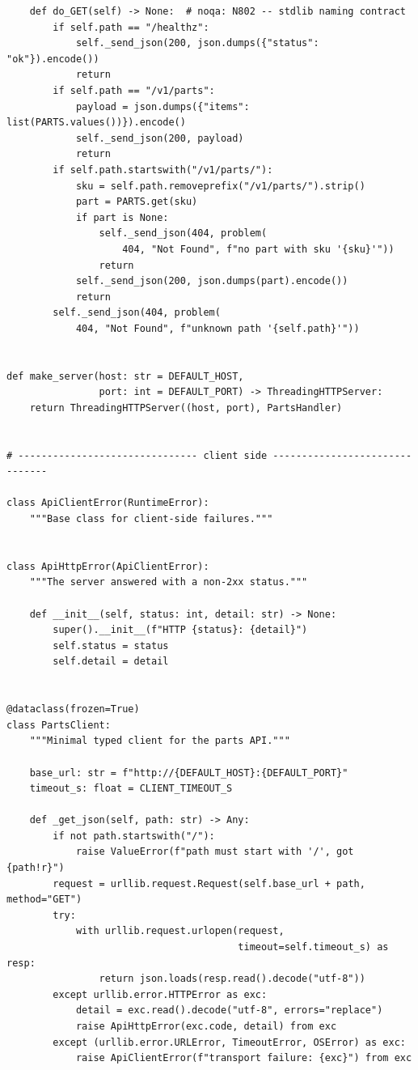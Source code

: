 \begin{verbatim}
    def do_GET(self) -> None:  # noqa: N802 -- stdlib naming contract
        if self.path == "/healthz":
            self._send_json(200, json.dumps({"status": "ok"}).encode())
            return
        if self.path == "/v1/parts":
            payload = json.dumps({"items": list(PARTS.values())}).encode()
            self._send_json(200, payload)
            return
        if self.path.startswith("/v1/parts/"):
            sku = self.path.removeprefix("/v1/parts/").strip()
            part = PARTS.get(sku)
            if part is None:
                self._send_json(404, problem(
                    404, "Not Found", f"no part with sku '{sku}'"))
                return
            self._send_json(200, json.dumps(part).encode())
            return
        self._send_json(404, problem(
            404, "Not Found", f"unknown path '{self.path}'"))


def make_server(host: str = DEFAULT_HOST,
                port: int = DEFAULT_PORT) -> ThreadingHTTPServer:
    return ThreadingHTTPServer((host, port), PartsHandler)


# ------------------------------- client side -------------------------------

class ApiClientError(RuntimeError):
    """Base class for client-side failures."""


class ApiHttpError(ApiClientError):
    """The server answered with a non-2xx status."""

    def __init__(self, status: int, detail: str) -> None:
        super().__init__(f"HTTP {status}: {detail}")
        self.status = status
        self.detail = detail


@dataclass(frozen=True)
class PartsClient:
    """Minimal typed client for the parts API."""

    base_url: str = f"http://{DEFAULT_HOST}:{DEFAULT_PORT}"
    timeout_s: float = CLIENT_TIMEOUT_S

    def _get_json(self, path: str) -> Any:
        if not path.startswith("/"):
            raise ValueError(f"path must start with '/', got {path!r}")
        request = urllib.request.Request(self.base_url + path, method="GET")
        try:
            with urllib.request.urlopen(request,
                                        timeout=self.timeout_s) as resp:
                return json.loads(resp.read().decode("utf-8"))
        except urllib.error.HTTPError as exc:
            detail = exc.read().decode("utf-8", errors="replace")
            raise ApiHttpError(exc.code, detail) from exc
        except (urllib.error.URLError, TimeoutError, OSError) as exc:
            raise ApiClientError(f"transport failure: {exc}") from exc


\end{verbatim}
